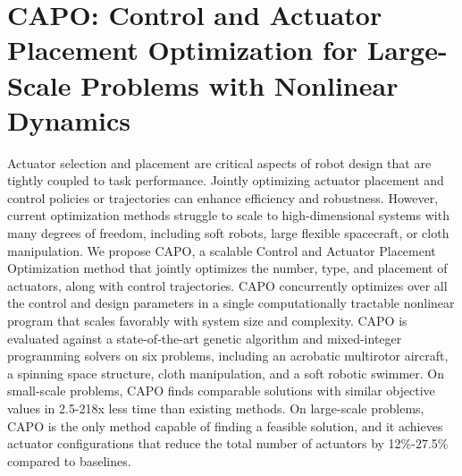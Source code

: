 \graphicspath{{sections/03_CAPO_Optimization/}}

\chapter{CAPO: Control and Actuator Placement Optimization for Large-Scale Problems with Nonlinear Dynamics}\label{sec:capo}
%
%
Actuator selection and placement are critical aspects of robot design that are tightly coupled to task performance. Jointly optimizing actuator placement and control policies or trajectories can enhance efficiency and robustness. However, current optimization methods struggle to scale to high-dimensional systems with many degrees of freedom, including soft robots, large flexible spacecraft, or cloth manipulation.
We propose CAPO, a scalable Control and Actuator Placement Optimization method that jointly optimizes the number, type, and placement of actuators, along with control trajectories. CAPO concurrently optimizes over all the control and design parameters in a single computationally tractable nonlinear program that scales favorably with system size and complexity.
CAPO is evaluated against a state-of-the-art genetic algorithm and mixed-integer programming solvers on six problems, including an acrobatic multirotor aircraft, a spinning space structure, cloth manipulation, and a soft robotic swimmer. On small-scale problems, CAPO finds comparable solutions with similar objective values in 2.5-218x less time than existing methods. On large-scale problems, CAPO is the only method capable of finding a feasible solution, and it achieves actuator configurations that reduce the total number of actuators by 12\%-27.5\% compared to baselines.

